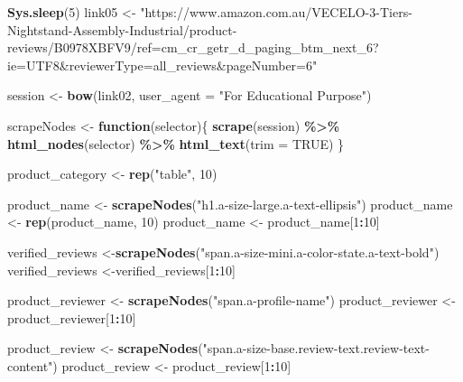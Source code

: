 \documentclass[
]{article}
\newenvironment{Shaded}{\begin{snugshade}}{\end{snugshade}}
\newcommand{\AttributeTok}[1]{\textcolor[rgb]{0.13,0.29,0.53}{#1}}
\newcommand{\ConstantTok}[1]{\textcolor[rgb]{0.56,0.35,0.01}{#1}}
\newcommand{\ControlFlowTok}[1]{\textcolor[rgb]{0.13,0.29,0.53}{\textbf{#1}}}
\newcommand{\DecValTok}[1]{\textcolor[rgb]{0.00,0.00,0.81}{#1}}
\newcommand{\FunctionTok}[1]{\textcolor[rgb]{0.13,0.29,0.53}{\textbf{#1}}}
\newcommand{\NormalTok}[1]{#1}
\newcommand{\OtherTok}[1]{\textcolor[rgb]{0.56,0.35,0.01}{#1}}
\newcommand{\SpecialCharTok}[1]{\textcolor[rgb]{0.81,0.36,0.00}{\textbf{#1}}}
\newcommand{\StringTok}[1]{\textcolor[rgb]{0.31,0.60,0.02}{#1}}
\begin{document}
\begin{Shaded}
\begin{Highlighting}[]
   \FunctionTok{Sys.sleep}\NormalTok{(}\DecValTok{5}\NormalTok{)}
\NormalTok{link05 }\OtherTok{\textless{}{-}} \StringTok{"https://www.amazon.com.au/VECELO{-}3{-}Tiers{-}Nightstand{-}Assembly{-}Industrial/product{-}reviews/B0978XBFV9/ref=cm\_cr\_getr\_d\_paging\_btm\_next\_6?ie=UTF8\&reviewerType=all\_reviews\&pageNumber=6"}


\NormalTok{  session }\OtherTok{\textless{}{-}} \FunctionTok{bow}\NormalTok{(link02,}
               \AttributeTok{user\_agent =} \StringTok{"For Educational Purpose"}\NormalTok{)}

\NormalTok{  scrapeNodes }\OtherTok{\textless{}{-}} \ControlFlowTok{function}\NormalTok{(selector)\{}
    \FunctionTok{scrape}\NormalTok{(session) }\SpecialCharTok{\%\textgreater{}\%}
      \FunctionTok{html\_nodes}\NormalTok{(selector) }\SpecialCharTok{\%\textgreater{}\%}
      \FunctionTok{html\_text}\NormalTok{(}\AttributeTok{trim =} \ConstantTok{TRUE}\NormalTok{)}
\NormalTok{  \}}

\NormalTok{  product\_category }\OtherTok{\textless{}{-}} \FunctionTok{rep}\NormalTok{(}\StringTok{"table"}\NormalTok{, }\DecValTok{10}\NormalTok{)}

\NormalTok{  product\_name }\OtherTok{\textless{}{-}} \FunctionTok{scrapeNodes}\NormalTok{(}\StringTok{"h1.a{-}size{-}large.a{-}text{-}ellipsis"}\NormalTok{)}
\NormalTok{  product\_name }\OtherTok{\textless{}{-}} \FunctionTok{rep}\NormalTok{(product\_name, }\DecValTok{10}\NormalTok{)}
\NormalTok{  product\_name }\OtherTok{\textless{}{-}}\NormalTok{ product\_name[}\DecValTok{1}\SpecialCharTok{:}\DecValTok{10}\NormalTok{]}
  
\NormalTok{  verified\_reviews }\OtherTok{\textless{}{-}}\FunctionTok{scrapeNodes}\NormalTok{(}\StringTok{"span.a{-}size{-}mini.a{-}color{-}state.a{-}text{-}bold"}\NormalTok{)}
\NormalTok{  verified\_reviews }\OtherTok{\textless{}{-}}\NormalTok{verified\_reviews[}\DecValTok{1}\SpecialCharTok{:}\DecValTok{10}\NormalTok{]}
  
\NormalTok{  product\_reviewer }\OtherTok{\textless{}{-}} \FunctionTok{scrapeNodes}\NormalTok{(}\StringTok{"span.a{-}profile{-}name"}\NormalTok{)}
\NormalTok{  product\_reviewer }\OtherTok{\textless{}{-}}\NormalTok{ product\_reviewer[}\DecValTok{1}\SpecialCharTok{:}\DecValTok{10}\NormalTok{]}
  
\NormalTok{  product\_review }\OtherTok{\textless{}{-}} \FunctionTok{scrapeNodes}\NormalTok{(}\StringTok{"span.a{-}size{-}base.review{-}text.review{-}text{-}content"}\NormalTok{)}
\NormalTok{  product\_review }\OtherTok{\textless{}{-}}\NormalTok{ product\_review[}\DecValTok{1}\SpecialCharTok{:}\DecValTok{10}\NormalTok{]}
  

\end{Highlighting}
\end{Shaded}
\end{document}
